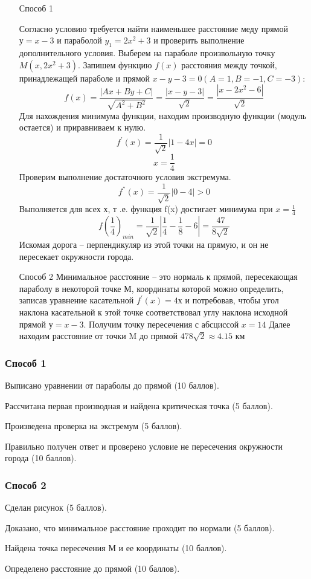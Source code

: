 \solutionSection

\begin{enumerate}
    \item [Способ 1] \;
    

    Согласно условию требуется найти наименьшее расстояние меду прямой $у=x-3$ и параболой $y_1=2x^2+3$ и проверить выполнение дополнительного условия. Выберем на параболе произвольную точку $M (x,2x^2+3)$. Запишем функцию $f(x)$ расстояния между точкой, принадлежащей параболе и прямой $x-y-3=0 (A=1, B=-1, C=-3)$:
    $$f(x)=\frac{|Ax+By+C|}{\sqrt{A^2+B^2}}=\frac{|x-y-3|}{\sqrt{2}}=\frac{|x-2x^2-6|}{\sqrt{2}}$$
    Для нахождения минимума функции, находим производную функции (модуль остается) и приравниваем к нулю. 
    $$f^{'}(x)=\frac{1}{\sqrt{2}}|1-4x|=0$$
    $$x=\frac{1}{4}$$
    Проверим выполнение достаточного условия экстремума. 
    $$f^{''}(x)=\frac{1}{\sqrt{2}}|0-4|>0$$
    Выполняется для всех х, т .е. функция f(x) достигает минимума при  $x=\frac{1}{4}$
    $$f\left(\frac{1}{4}\right)_{min} =\frac{1}{\sqrt{2}}\left|\frac{1}{4}-\frac{1}{8}-6\right|=\frac{47}{8\sqrt{2}}$$
    Искомая дорога – перпендикуляр из этой точки на прямую, и он не пересекает окружности города.\\
    \item [Способ 2]
    Минимальное расстояние – это нормаль к прямой, пересекающая параболу в некоторой точке М, координаты которой можно определить, записав уравнение касательной $f^{'}(x)=4х$ и потребовав, чтобы угол наклона касательной к этой точке соответствовал углу наклона исходной прямой $у=x-3$. Получим точку пересечения с абсциссой $x=14$ Далее находим расстояние от точки M до прямой $478\sqrt{2}\approx4.15$ км
    
\end{enumerate}

\markSection

\subsubsection[]{Способ 1}

Выписано уравнении от параболы до прямой (10 баллов). 

Рассчитана первая производная и найдена критическая точка (5 баллов). 

Произведена проверка на экстремум (5 баллов). 

Правильно получен ответ и проверено условие не пересечения окружности города (10 баллов).

\subsubsection[]{Способ 2}

Сделан рисунок (5 баллов). 

Доказано, что минимальное расстояние проходит по нормали (5 баллов). 

Найдена точка пересечения $М$ и ее координаты (10 баллов). 

Определено расстояние до прямой (10 баллов).
